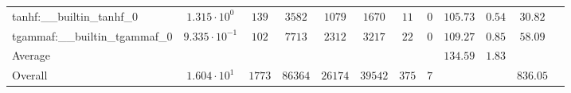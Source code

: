 \begin{tabular}{|l|c|c|c|c|c|c|c|c|c|c|c|}
tanhf:\_\_builtin\_tanhf\_0               & $ 1.315 \cdot 10^{0}  $ & $ 139    $ & $ 3582  $ & $ 1079  $ & $ 1670  $ & $ 11  $ & $ 0 $ & $ 105.73      $ & $ 0.54    $ & $ 30.82   $ \\
tgammaf:\_\_builtin\_tgammaf\_0           & $ 9.335 \cdot 10^{-1} $ & $ 102    $ & $ 7713  $ & $ 2312  $ & $ 3217  $ & $ 22  $ & $ 0 $ & $ 109.27      $ & $ 0.85    $ & $ 58.09   $ \\
\hline
Average                                   & $                     $ & $        $ & $       $ & $       $ & $       $ & $     $ & $   $ & $ 134.59      $ & $ 1.83    $ & $         $ \\
\hline
Overall                                   & $ 1.604 \cdot 10^{1}  $ & $ 1773   $ & $ 86364 $ & $ 26174 $ & $ 39542 $ & $ 375 $ & $ 7 $ & $             $ & $         $ & $ 836.05  $ \\
\hline
\end{tabular}

